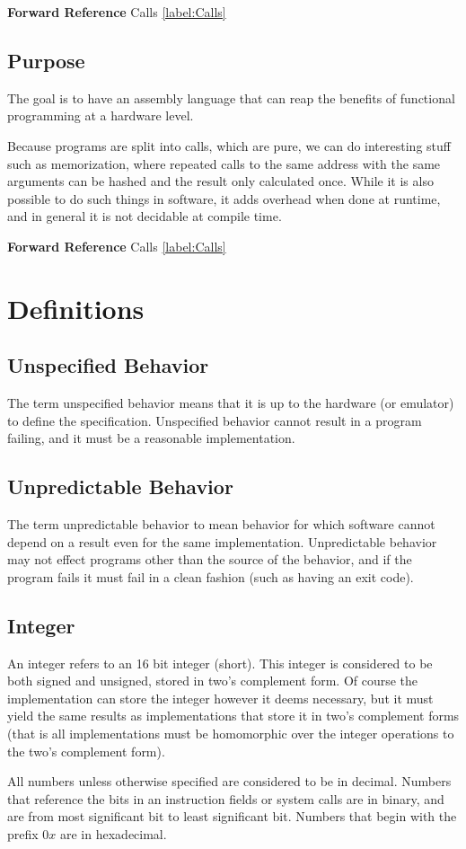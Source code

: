 \documentclass[12pt,letterpaper]{report}
\newcommand{\SEE}{\textbf{Forward Reference} }
\newcommand{\fref}[2]{#2 \ref{#1:#2}}
\begin{document}
\SEE \fref{label}{Calls}
\section{Purpose}
The goal is to have an assembly language that can reap the benefits of functional programming at a hardware level.

Because programs are split into calls, which are pure, we can do interesting stuff such as memorization, where repeated calls to the same address with the same arguments can be hashed and the result only calculated once. While it is also possible to do such things in software, it adds overhead when done at runtime, and in general it is not decidable at compile time.

\SEE \fref{label}{Calls}
\chapter{Definitions}
\section{Unspecified Behavior}
\label{label:Unspecified Behavior}
The term unspecified behavior means that it is up to the hardware (or emulator) to define the specification. Unspecified behavior cannot result in a program failing, and it must be a reasonable implementation.
\section{Unpredictable Behavior}
\label{label:Unpredictable Behavior}
The term unpredictable behavior to mean behavior for which software cannot depend on a result even for the same implementation. Unpredictable behavior may not effect programs other than the source of the behavior, and if the program fails it must fail in a clean fashion (such as having an exit code).
\section{Integer}
An integer refers to an 16 bit integer (short). This integer is considered to be both signed and unsigned, stored in two's complement form. Of course the implementation can store the integer however it deems necessary, but it must yield the same results as implementations that store it in two's complement forms (that is all implementations must be homomorphic over the integer operations to the two's complement form).

All numbers unless otherwise specified are considered to be in decimal. Numbers that reference the bits in an instruction fields or system calls are in binary, and are from most significant bit to least significant bit. Numbers that begin with the prefix $0x$ are in hexadecimal.
\end{document}
